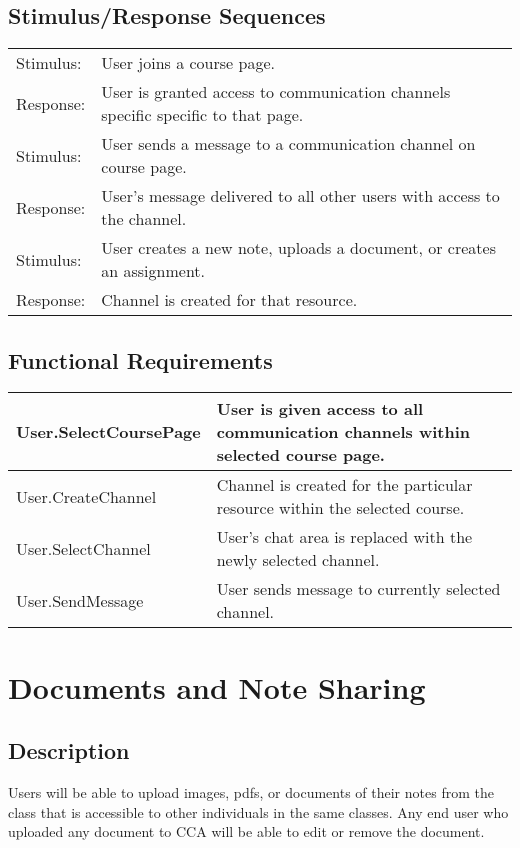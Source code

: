 \documentclass{scrreprt}
\begin{document}
\subsection{Stimulus/Response Sequences}
\begin{tabular}{| p{2cm} | p{12cm} | }
	\hline
	Stimulus: & User joins a course page. \\
	Response: & User is granted access to communication channels specific specific to that page. \\ \hline
	Stimulus: & User sends a message to a communication channel on course page. \\
	Response: & User’s message delivered to all other users with access to the channel. \\ \hline
	Stimulus: & User creates a new note, uploads a document, or creates an assignment. \\
	Response: & Channel is created for that resource. \\
	\hline
\end{tabular}

\subsection{Functional Requirements}
\begin{tabular}{| p{4cm} | p{10cm} |}
\hline
User.SelectCoursePage & User is given access to all communication channels within selected course page. \\ \hline
User.CreateChannel & Channel is created for the particular resource within the selected course. \\ \hline
User.SelectChannel  & User’s chat area is replaced with the newly selected channel. \\ \hline
User.SendMessage & User sends message to currently selected channel. \\
\hline
\end{tabular}


\section{Documents and Note Sharing}
\subsection{Description}
Users will be able to upload images, pdfs, or documents of their notes from the class that is accessible to other individuals in the same classes. Any end user who uploaded any document to CCA will be able to edit or remove the document. 
\end{document}
